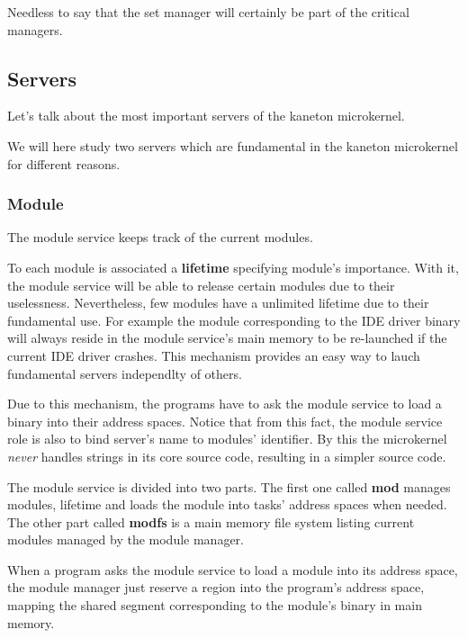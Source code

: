\begin{multicols}{2}
Needless to say that the set manager will certainly be part of the critical
managers.

%
%

\subsection{Servers}

Let's talk about the most important servers of the kaneton microkernel.

We will here study two servers which are fundamental in the kaneton
microkernel for different reasons.

%
%

\subsubsection{Module}

The module service keeps track of the current modules.

To each module is associated a \textbf{lifetime} specifying module's
importance. With it, the module service will be able to release certain
modules due to their uselessness. Nevertheless, few modules have a
unlimited lifetime due to their fundamental use. For example the module
corresponding to the IDE driver binary will always reside in the module
service's main memory to be re-launched if the current IDE driver crashes.
This mechanism provides an easy way to lauch fundamental servers independlty
of others.

Due to this mechanism, the programs have to ask the module service to load
a binary into their address spaces. Notice that from this fact, the module
service role is also to bind server's name to modules' identifier. By this
the microkernel \textit{never} handles strings in its core source code,
resulting in a simpler source code.

The module service is divided into two parts. The first one called \textbf{mod}
manages modules, lifetime and loads the module into tasks' address spaces
when needed. The other part called \textbf{modfs} is a main memory file
system listing current modules managed by the module manager.

When a program asks the module service to load a module into its address
space, the module manager just reserve a region into the program's address
space, mapping the shared segment corresponding to the module's binary in
main memory.

%
%


\end{multicols}
